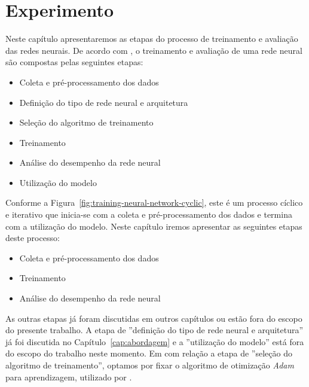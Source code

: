 \chapter{Experimento}
\label{cap:experimento}


Neste capítulo apresentaremos as etapas do processo de treinamento e avaliação das redes neurais. De acordo com \cite{nndesign:2014:pratical-training-issues}, o treinamento e avaliação de uma rede neural são compostas pelas seguintes etapas:
\begin{itemize}
    \item Coleta e pré-processamento dos dados
    \item Definição do tipo de rede neural e arquitetura
    \item Seleção do algoritmo de treinamento
    \item Treinamento
    \item Análise do desempenho da rede neural
    \item Utilização do modelo
\end{itemize}

Conforme a Figura~\ref{fig:training-neural-network-cyclic}, este é um processo cíclico e iterativo que inicia-se com a coleta e pré-processamento dos dados e termina com a utilização do modelo. Neste capítulo iremos apresentar as seguintes etapas deste processo:

\begin{itemize}
    \item Coleta e pré-processamento dos dados
    \item Treinamento
    \item Análise do desempenho da rede neural
\end{itemize}

As outras etapas já foram discutidas em outros capítulos ou estão fora do escopo do presente trabalho. A etapa de ''definição do tipo de rede neural e arquitetura'' já foi discutida no Capítulo~\ref{cap:abordagem} e a ''utilização do modelo'' está fora do escopo do trabalho neste momento. Em com relação a etapa de ''seleção do algoritmo de treinamento'', optamos por fixar o algoritmo de otimização \emph{Adam} para aprendizagem, utilizado por \cite{yao-2018}. 



